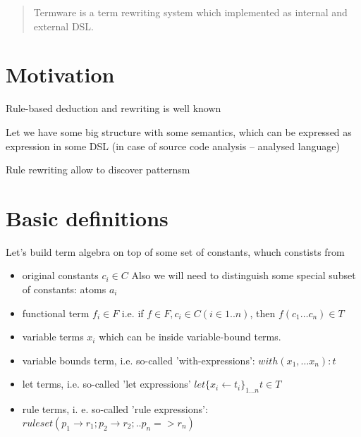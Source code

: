 \documentclass[12pt]{article}
\begin{document}
\maketitle

\begin{abstract}
 Termware is a term rewriting system which implemented as internal and external DSL.
\end{abstract}

\section{Motivation}

  Rule-based deduction and rewriting is well known

 Let we have some big structure with some semantics, which can be expressed as expression in some DSL (in case of source code
 analysis -- analysed language)

 Rule rewriting allow to discover patternsm

\section{Basic definitions}

   Let's build term algebra on top of some set of constants, whuch constists from
\begin{itemize}
 \item original constants ${c_i} \in C$ Also we
 will need to distinguish some special subset of constants: atoms ${a_i}$
 \item functional term $f_i \in F$  i.e. if $f \in F, c_i \in C (i \in 1..n)$, then $f(c_{1} \dots c_{n}) \in T$
 \item variable terms $x_{i}$ which can be inside variable-bound terms.
 \item variable bounds term, i.e. so-called 'with-expressions': $with(x_1,\dots x_n):t$
 \item let terms, i.e. so-called 'let expressions' $let \{ x_i \leftarrow t_i \}_{1\dots n} t  \in T$
 \item rule terms, i. e. so-called 'rule expressions': $ruleset(p_1 \to r_1 ; p_2 \to r_2; .. p_n => r_n)$
\end{itemize}





\end{document}

